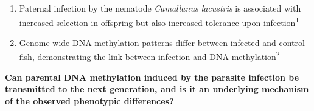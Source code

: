 \documentclass[25pt, a0paper, portrait, margin=0mm, innermargin=15mm,
     blockverticalspace=10mm, colspace=15mm, subcolspace=8mm]{tikzposter}
\begin{document}
\block{}
{\Large
\begin{enumerate}
  \item Paternal infection by the nematode \textit{Camallanus lacustris} is associated with increased selection in offspring but also increased tolerance upon infection\textsuperscript{1}
  \item Genome-wide DNA methylation patterns differ between infected and control fish, demonstrating the link between infection and DNA methylation\textsuperscript{2}
\end{enumerate}
\vspace{5mm} %
\textbf{Can parental DNA methylation induced by the parasite infection be transmitted to the next generation, and is it an underlying mechanism of the observed phenotypic differences?}
}

\end{document}
